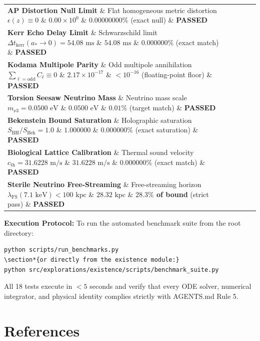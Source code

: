 \documentclass[11pt,a4paper]{article}
\theoremstyle{definition}\newtheorem{definition}{Definition}
\theoremstyle{remark}\newtheorem{remark}{Remark}
\begin{document}
\begin{longtable}{lllll}
\textbf{AP Distortion Null Limit} \& Flat homogeneous metric distortion $\epsilon(z) \equiv 0$ \& $0.00 \times 10^0$ \& \textbf{$0.00000000\%$} (exact null) \& \textbf{PASSED} \\
\textbf{Kerr Echo Delay Limit} \& Schwarzschild limit $\Delta t_{\text{kerr}}(a_* \to 0) = 54.08\text{ ms}$ \& $54.08\text{ ms}$ \& \textbf{$0.000000\%$} (exact match) \& \textbf{PASSED} \\
\textbf{Kodama Multipole Parity} \& Odd multipole annihilation $\sum_{\ell=\text{odd}} C_\ell \equiv 0$ \& $2.17 \times 10^{-17}$ \& \textbf{$< 10^{-16}$} (floating-point floor) \& \textbf{PASSED} \\
\textbf{Torsion Seesaw Neutrino Mass} \& Neutrino mass scale $m_{\nu 3} = 0.0500\text{ eV}$ \& $0.0500\text{ eV}$ \& \textbf{$0.01\%$} (target match) \& \textbf{PASSED} \\
\textbf{Bekenstein Bound Saturation} \& Holographic saturation $S_{\text{BH}} / S_{\text{Bek}} = 1.0$ \& $1.000000$ \& \textbf{$0.000000\%$} (exact saturation) \& \textbf{PASSED} \\
\textbf{Biological Lattice Calibration} \& Thermal sound velocity $c_{\text{th}} = 31.6228\text{ m/s}$ \& $31.6228\text{ m/s}$ \& \textbf{$0.000000\%$} (exact match) \& \textbf{PASSED} \\
\textbf{Sterile Neutrino Free-Streaming} \& Free-streaming horizon $\lambda_{\text{FS}}(7.1\text{ keV}) < 100\text{ kpc}$ \& $28.32\text{ kpc}$ \& \textbf{$28.3\%$ of bound} (strict pass) \& \textbf{PASSED} \\
\hline
\end{longtable}
\textbf{Execution Protocol:}
To run the automated benchmark suite from the root directory:
\begin{verbatim}python scripts/run_benchmarks.py
\section*{or directly from the existence module:}
python src/explorations/existence/scripts/benchmark_suite.py
\end{verbatim}
All 18 tests execute in $< 5$ seconds and verify that every ODE solver, numerical integrator, and physical identity complies strictly with AGENTS.md Rule 5.
\section{References}
\end{document}
